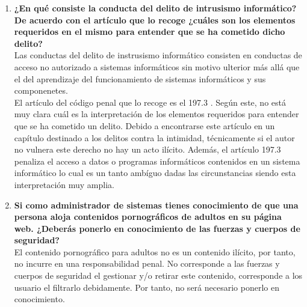 \documentclass[10pt,a4paper]{article}
\begin{document}
\begin{enumerate}
\item \textbf{¿En qué consiste la conducta del delito de intrusismo informático? De acuerdo con el artículo que lo recoge ¿cuáles son los elementos requeridos en el mismo para entender que se ha cometido dicho delito?}\\
Las conductas del delito de instrusismo informático consisten en conductas de acceso no autorizado a sistemas informáticos sin motivo ulterior más allá que el del aprendizaje del funcionamiento de sistemas informáticos y sus componenetes.\\

El artículo del código penal que lo recoge es el 197.3 \cite{cp}. Según este, no está muy clara cuál es la interpretación de los elementos requeridos para entender que se ha cometido un delito. Debido a encontrarse este artículo en un capítulo destinado a los delitos contra la intimidad, técnicamente si el autor no vulnera este derecho no hay un acto ilícito. Además, el artículo 197.3 penaliza el acceso a datos o programas informáticos contenidos en un sistema informático lo cual es un tanto ambíguo dadas las circunstancias siendo esta interpretación muy amplia.

\item \textbf{Si como administrador de sistemas tienes conocimiento de que una persona aloja contenidos pornográficos de adultos en su página web. ¿Deberás ponerlo en conocimiento de las fuerzas y cuerpos de seguridad?}\\
El contenido pornográfico para adultos no es un contenido ilícito, por tanto, no incurre en una responsabilidad penal. No corresponde a las fuerzas y cuerpos de seguridad el gestionar y/o retirar este contenido, corresponde a los usuario el filtrarlo debidamente. Por tanto, no será necesario ponerlo en conocimiento.


\end{enumerate}
\end{document}
